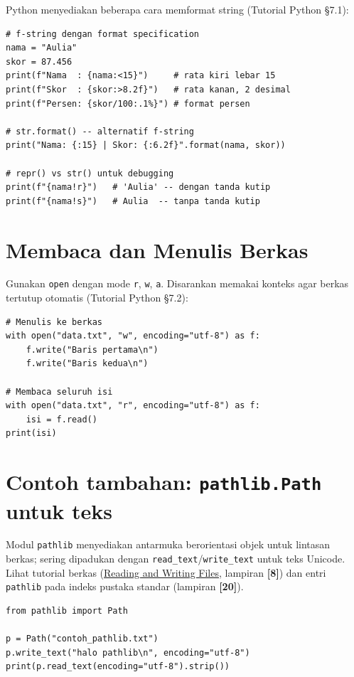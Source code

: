 \documentclass[../main.tex]{subfiles}
\begin{document}
Python menyediakan beberapa cara memformat string (Tutorial Python §7.1):

\begin{lstlisting}[caption=Format string: f-string dan format() (Tutorial Python ss7.1)]
# f-string dengan format specification
nama = "Aulia"
skor = 87.456
print(f"Nama  : {nama:<15}")     # rata kiri lebar 15
print(f"Skor  : {skor:>8.2f}")   # rata kanan, 2 desimal
print(f"Persen: {skor/100:.1%}") # format persen

# str.format() -- alternatif f-string
print("Nama: {:15} | Skor: {:6.2f}".format(nama, skor))

# repr() vs str() untuk debugging
print(f"{nama!r}")   # 'Aulia' -- dengan tanda kutip
print(f"{nama!s}")   # Aulia  -- tanpa tanda kutip
\end{lstlisting}

\section{Membaca dan Menulis Berkas}

Gunakan \texttt{open} dengan mode \texttt{r}, \texttt{w}, \texttt{a}. Disarankan memakai konteks  agar berkas tertutup otomatis (Tutorial Python §7.2):

\begin{lstlisting}[caption=Menulis dan membaca berkas]
# Menulis ke berkas
with open("data.txt", "w", encoding="utf-8") as f:
    f.write("Baris pertama\n")
    f.write("Baris kedua\n")

# Membaca seluruh isi
with open("data.txt", "r", encoding="utf-8") as f:
    isi = f.read()
print(isi)
\end{lstlisting}

\section{Contoh tambahan: \texttt{pathlib.Path} untuk teks}

\noindent Modul \texttt{pathlib} menyediakan antarmuka berorientasi objek untuk lintasan berkas; sering dipadukan dengan \texttt{read\_text}/\texttt{write\_text} untuk teks Unicode. Lihat tutorial berkas (\href{https://docs.python.org/3/tutorial/inputoutput.html#reading-and-writing-files}{Reading and Writing Files}, lampiran \textbf{[8]}) dan entri \texttt{pathlib} pada indeks pustaka standar (lampiran \textbf{[20]}).

\begin{lstlisting}[caption=pathlib ringkas]
from pathlib import Path

p = Path("contoh_pathlib.txt")
p.write_text("halo pathlib\n", encoding="utf-8")
print(p.read_text(encoding="utf-8").strip())
\end{lstlisting}
\end{document}
